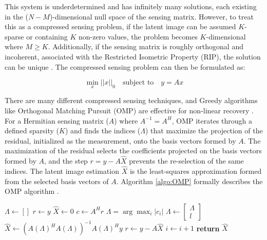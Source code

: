\documentclass[journal]{IEEEtran}
\begin{document}
This system is underdetermined and has infinitely many solutions, each existing in the ($N-M$)-dimensional null space of the sensing matrix. However, to treat this as a compressed sensing problem, if the latent image can be assumed $K$-sparse or containing $K$ non-zero values, the problem becomes $K$-dimensional where $M \geq K$. Additionally, if the sensing matrix is roughly orthogonal and incoherent, associated with the Restricted Isometric Property (RIP), the solution can be unique \cite{Majumdar_2018}. The compressed sensing problem can then be formulated as:

\begin{equation}
    \min_{x} ||x||_{0} \quad \text{subject to} \quad y = Ax
    \label{eq:l0}
\end{equation}

There are many different compressed sensing techniques, and Greedy algorithms like Orthogonal Matching Pursuit (OMP) are effective for non-linear recovery \cite{Bostock_2017}. For a Hermitian sensing matrix ($A$) where $A^{-1} = A^{H}$, OMP iterates through a defined sparsity ($K$) and finds the indices ($\Lambda$) that maximize the projection of the residual, initialized as the measurement, onto the basis vectors formed by $A$. The maximization of the residual selects the coefficients projected on the basis vectors formed by $A$, and the step $r = y - A \hat{X}$ prevents the re-selection of the same indices. The latent image estimation $\hat{X}$ is the least-squares approximation formed from the selected basis vectors of $A$. Algorithm \ref{algo:OMP} formally describes the OMP algorithm \cite{Majumdar_2018}.

\begin{algorithm}[H]
\caption{Orthogonal Matching Pursuit}\label{algo:OMP}
\begin{algorithmic}[1]
\State $\Lambda\gets []$
\State $r \gets y$
\State $\hat{X} \gets 0$
\State $c\gets A^{H}r$
\State $\Lambda = \arg\max_{i} \big| c_i \big|$
\State $\Lambda \gets \begin{bmatrix} \Lambda \\ l \end{bmatrix}$
\State $\hat{X} \gets (A(\Lambda)^{H}A(\Lambda))^{-1}A(\Lambda)^{H}y$
\State $r \gets y - A\hat{X}$
\State $i \gets i + 1$
\EndFor
\State \textbf{return} $\hat{X}$
\EndProcedure
\end{algorithmic}
\end{algorithm}

\end{document}
